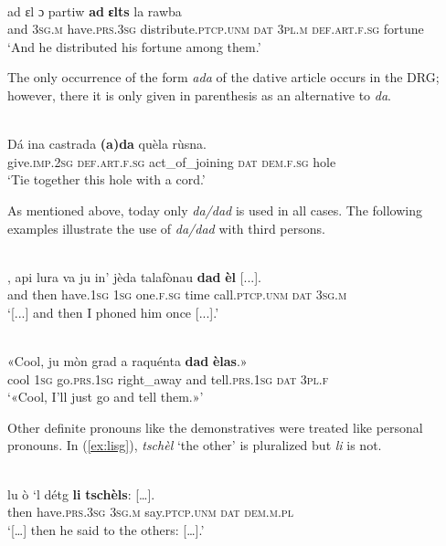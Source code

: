  \ea\label{}
\\
\gll ad ɛl ɔ partiw \textbf{ad} \textbf{ɛlts} la rawba\\
     and \textsc{3sg.m} have.\textsc{prs.3sg} distribute.\textsc{ptcp.unm} \textsc{dat} \textsc{3pl.m} \textsc{def.art.f.sg} fortune\\
\glt `And he distributed his fortune among them.'
\z

The only occurrence of the form \textit{ada} of the dative article occurs in the DRG; however, there it is only given in parenthesis as an alternative to \textit{da}.

\ea\label{}
\\
\gll  Dá ina castrada \textbf{(a)da} quèla rùsna.\\
     give.\textsc{imp.2sg} \textsc{def.art.f.sg} act\_of\_joining \textsc{dat} \textsc{dem.f.sg} hole\\
\glt `Tie together this hole with a cord.'
\z

As mentioned above, today only \textit{da/dad} is used in all cases. The following examples illustrate the use of \textit{da/dad} with third persons.

\ea
\label{}
\\ 
\gll  [...], api lura va ju in’ jèda talafònau \textbf{dad} \textbf{èl} [...].\\
{} and then have.\textsc{1sg}  \textsc{1sg} one.\textsc{f.sg} time call.\textsc{ptcp.unm} \textsc{dat} \textsc{3sg.m}\\
\glt `[...] and then I phoned him once [...].'
\z

\ea
\label{}
\\
\gll  «Cool, ju mòn grad a raquénta \textbf{dad} \textbf{èlas}.»\\
cool \textsc{1sg}  go.\textsc{prs.1sg} right\_away and tell.\textsc{prs.1sg} \textsc{dat} \textsc{3pl.f} \\
\glt `«Cool, I’ll just go and tell them.»'
\z

Other definite pronouns like the demonstratives were treated like personal pronouns. In (\ref{ex:lisg}), \textit{tschèl} `the other' is pluralized but \textit{li} is not.

\ea\label{ex:lisg}
\\
\gll  […] lu ò ‘l détg \textbf{li} \textbf{tschèls}: […].\\
{} then have.\textsc{prs.3sg} \textsc{3sg.m} say.\textsc{ptcp.unm} \textsc{dat} \textsc{dem.m.pl}\\
\glt `[…] then he said to the others: […].'
\z


